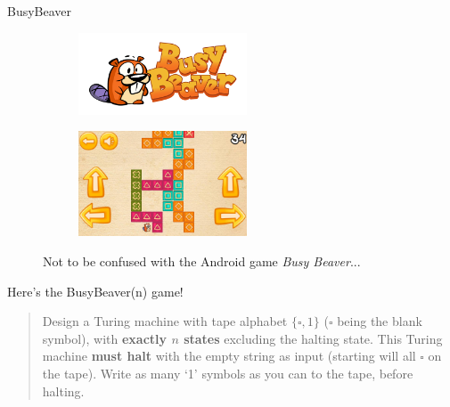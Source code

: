 \documentclass{beamer}
\begin{document}
\begin{frame}{BusyBeaver}
\begin{figure}
\centering
\begin{subfigure}{0.45\textwidth}
    \centering
    \includegraphics[width=5cm]{img/busybeaver.png}
\end{subfigure}
\begin{subfigure}{0.45\textwidth}
    \centering
    \includegraphics[width=5cm]{img/gameplay.jpg}
\end{subfigure}
    \caption*{Not to be confused with the Android game \textit{Busy Beaver}...}
\end{figure}
Here's the BusyBeaver(n) game!
\begin{quote}
    Design a Turing machine with tape alphabet $\{\square, 1\}$ ($\square$ being the blank symbol), with \textbf{exactly $n$ states} excluding the halting state. This Turing machine \textbf{must halt} with the empty string as input (starting will all $\square$ on the tape). Write as many `1' symbols as you can to the tape, before halting.
\end{quote}
\end{frame}
\end{document}
